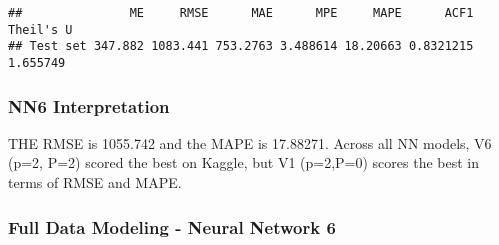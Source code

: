 \documentclass[
]{article}
\newenvironment{Shaded}{\begin{snugshade}}{\end{snugshade}}
\newcommand{\CommentTok}[1]{\textcolor[rgb]{0.56,0.35,0.01}{\textit{#1}}}
\newcommand{\FunctionTok}[1]{\textcolor[rgb]{0.00,0.00,0.00}{#1}}
\newcommand{\NormalTok}[1]{#1}
\newcommand{\OtherTok}[1]{\textcolor[rgb]{0.56,0.35,0.01}{#1}}
\newcommand{\SpecialCharTok}[1]{\textcolor[rgb]{0.00,0.00,0.00}{#1}}
\begin{document}
\begin{Shaded}
\end{Shaded}

\begin{verbatim}
##               ME     RMSE      MAE      MPE     MAPE      ACF1 Theil's U
## Test set 347.882 1083.441 753.2763 3.488614 18.20663 0.8321215  1.655749
\end{verbatim}

\begin{Shaded}
\end{Shaded}

\hypertarget{nn6-interpretation}{%
\subsubsection{NN6 Interpretation}\label{nn6-interpretation}}

THE RMSE is 1055.742 and the MAPE is 17.88271. Across all NN models, V6
(p=2, P=2) scored the best on Kaggle, but V1 (p=2,P=0) scores the best
in terms of RMSE and MAPE.

\hypertarget{full-data-modeling---neural-network-6}{%
\subsubsection{Full Data Modeling - Neural Network
6}\label{full-data-modeling---neural-network-6}}
\end{document}
